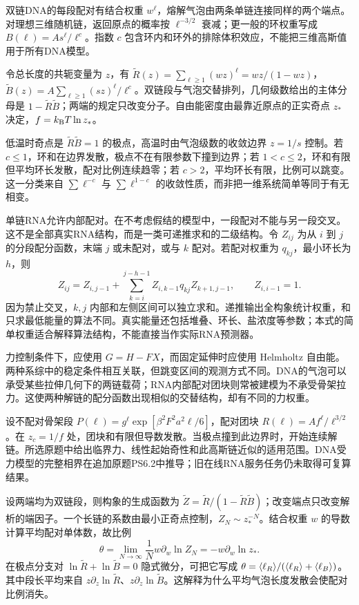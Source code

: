 双链DNA的每段配对有结合权重 $w^\ell$，熔解气泡由两条单链连接同样的两个端点。对理想三维随机链，返回原点的概率按 $\ell^{-3/2}$ 衰减；更一般的环权重写成 $B(\ell)=A s^\ell/\ell^c$。指数 $c$ 包含环内和环外的排除体积效应，不能把三维高斯值用于所有DNA模型。

令总长度的共轭变量为 $z$，有 $\widetilde R(z)=\sum_{\ell\ge1}(wz)^\ell=wz/(1-wz)$，$\widetilde B(z)=A\sum_{\ell\ge1}(sz)^\ell/\ell^c$。双链段与气泡交替排列，几何级数给出的主体分母是 $1-\widetilde R\widetilde B$；两端的规定只改变分子。自由能密度由最靠近原点的正实奇点 $z_*$ 决定，$f=k_{\mathrm B} T\ln z_*$。

低温时奇点是 $\widetilde R\widetilde B=1$ 的极点，高温时由气泡级数的收敛边界 $z=1/s$ 控制。若 $c\le1$，环和在边界发散，极点不在有限参数下撞到边界；若 $1<c\le2$，环和有限但平均环长发散，配对比例连续趋零；若 $c>2$，平均环长有限，比例可以跳变。这一分类来自 $\sum\ell^{-c}$ 与 $\sum\ell^{1-c}$ 的收敛性质，而非把一维系统简单等同于有无相变。

单链RNA允许内部配对。在不考虑假结的模型中，一段配对不能与另一段交叉。这不是全部真实RNA结构，而是一类可递推求和的二级结构。令 $Z_{ij}$ 为从 $i$ 到 $j$ 的分段配分函数，末端 $j$ 或未配对，或与 $k$ 配对。若配对权重为 $q_{kj}$，最小环长为 $h$，则
\[
Z_{ij}=Z_{i,j-1}+\sum_{k=i}^{j-h-1}Z_{i,k-1}q_{kj}Z_{k+1,j-1},\qquad Z_{i,i-1}=1.
\]
因为禁止交叉，$k,j$ 内部和左侧区间可以独立求和。递推输出全构象统计权重，和只求最低能量的算法不同。真实能量还包括堆叠、环长、盐浓度等参数；本式的简单权重适合解释算法结构，不能直接当作实际RNA预测器。

力控制条件下，应使用 $G=H-FX$，而固定延伸时应使用 Helmholtz 自由能。两种系综中的稳定条件相互关联，但跳变区间的观测方式不同。DNA的气泡可以承受某些拉伸几何下的两链载荷；RNA内部配对团块则常被建模为不承受骨架拉力。这使两种解链的配分函数出现相似的交替结构，却有不同的力权重。

设不配对骨架段 $P(\ell)=g^\ell\exp[\beta^2F^2a^2\ell/6]$，配对团块 $R(\ell)=Af^\ell/\ell^{3/2}$。在 $z_c=1/f$ 处，团块和有限但导数发散。当极点撞到此边界时，开始连续解链。所选原题中给出临界力、线性起始奇性和此高斯链近似的适用范围。DNA受力模型的完整相界在追加原题PS6.2中推导；旧在线RNA服务任务仍未取得可复算结果。

设两端均为双链段，则构象的生成函数为 $\widetilde Z=\widetilde R/(1-\widetilde R\widetilde B)$；改变端点只改变解析的端因子。一个长链的系数由最小正奇点控制，$Z_N\sim z_*^{-N}$。结合权重 $w$ 的导数计算平均配对单体数，故比例
\[
\theta=\lim_{N\to\infty}\frac1N w\partial_w\ln Z_N
=-w\partial_w\ln z_*.
\]
在极点分支对 $\ln\widetilde R+\ln\widetilde B=0$ 隐式微分，可把它写成 $\theta=\langle \ell_R\rangle/(\langle \ell_R\rangle+\langle \ell_B\rangle)$。其中段长平均来自 $z\partial_z\ln\widetilde R$、$z\partial_z\ln\widetilde B$。这解释为什么平均气泡长度发散会使配对比例消失。

